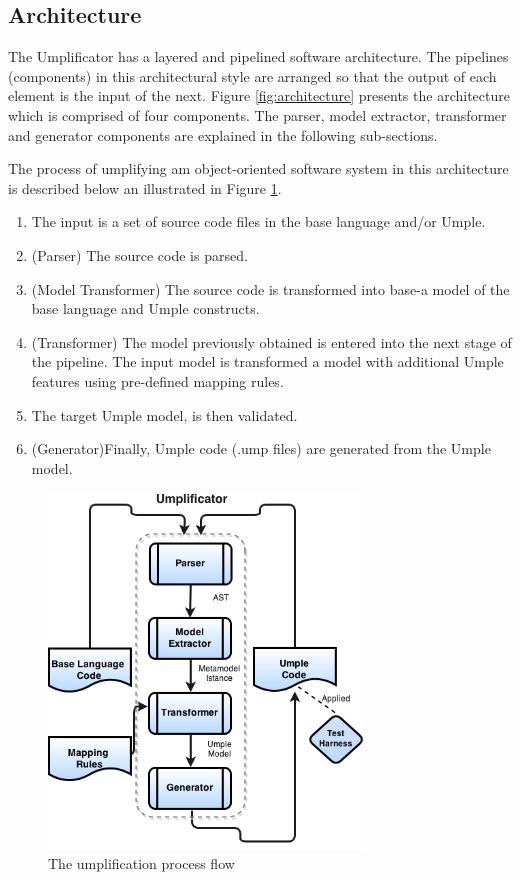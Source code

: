 \subsection{Architecture}
\label{sec:architecture}

The Umplificator has a layered and pipelined software architecture. The pipelines (components) in this architectural style are arranged so that the output of each element is the input of the next.  Figure \ref{fig:architecture} presents the architecture which is comprised  of four components. The parser, model extractor, transformer and generator components are explained in the following sub-sections.

The process of umplifying am object-oriented software system in this architecture is described below an illustrated in Figure \ref{fig:process_flow}.

\begin{enumerate}
\item  The input is a set of source code files in the base language and/or Umple.
\item (Parser) The source code is parsed. 
\item (Model Transformer) The source code is transformed into base-a model of the base language and Umple constructs.
\item (Transformer) The model previously obtained is entered into the next stage of the pipeline. The input model is transformed a model with additional Umple features using pre-defined mapping rules. 
\item The target Umple model, is then validated. 
\item (Generator)Finally, Umple code (.ump files) are generated from the Umple model.
\end{enumerate}

\begin{figure}[h]
\centering
\includegraphics[width=0.75\textwidth]{Figures/Umplificator_ProcessFlow.png} 
\caption{The umplification process flow}
\label{fig:process_flow}
\end{figure}

